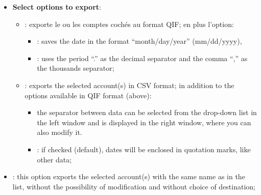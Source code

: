\begin{enumerate}
\begin{itemize}
			\item \textbf{Select options to export}:%
				\begin{itemize}
					\item {}: exporte le ou les comptes cochés au format \gls{QIF}; en plus l'option:
						\begin{itemize}
							\item {}: saves the date in the format \enquote{month/day/year} (mm/dd/yyyy),
							\item {}: uses the period \enquote{.} as the decimal separator and the comma \enquote{,} as the thousands separator;
						\end{itemize}
					\item {}: exports the selected account(s) in \gls{CSV} format; in addition to the options available in QIF format (above):
						\begin{itemize}
							\item the separator between data can be selected from the drop-down list in the left window and is displayed in the right window, where you can also modify it.
							\item {}: if checked (default), dates will be enclosed in quotation marks, like other data;
						\end{itemize}
				\end{itemize}
			\item {}: this option exports the selected account(s) with the same name as in the list, without the possibility of modification and without choice of destination;

\end{itemize}
\end{enumerate}
